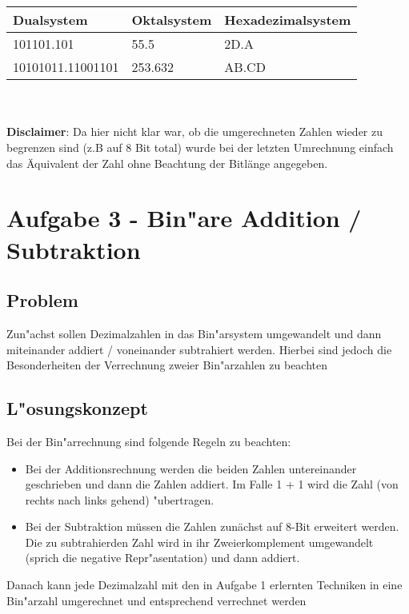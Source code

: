 \documentclass[a4paper,11pt,titlepage]{article}
\begin{document}
    \\ \\

    \begin{table}[h]
        \centering
        \begin{tabular}{|l|l|l|}
            \hline
            Dualsystem        & Oktalsystem & Hexadezimalsystem \\ \hline
            101101.101        & 55.5        & 2D.A              \\ \hline
            10101011.11001101 & 253.632     & AB.CD             \\ \hline
        \end{tabular}
        \label{tab:table}
    \end{table}

    \\ \\

    \noindent \textbf{Disclaimer}: Da hier nicht klar war, ob die umgerechneten Zahlen wieder zu begrenzen sind (z.B auf 8 Bit total) wurde bei der letzten Umrechnung einfach das Äquivalent der Zahl ohne Beachtung der Bitlänge angegeben.


    \section{Aufgabe 3 - Bin"are Addition / Subtraktion}

    \subsection{Problem}
    Zun"achst sollen Dezimalzahlen in das Bin"arsystem umgewandelt und dann miteinander addiert / voneinander subtrahiert werden. Hierbei sind jedoch die Besonderheiten der Verrechnung zweier Bin"arzahlen zu beachten

    \subsection{L"osungskonzept}
    Bei der Bin"arrechnung sind folgende Regeln zu beachten:
    \begin{itemize}
        \item Bei der Additionsrechnung werden die beiden Zahlen untereinander geschrieben und dann die Zahlen addiert. Im Falle 1 + 1 wird die Zahl (von rechts nach links gehend) "ubertragen.
        \item Bei der Subtraktion müssen die Zahlen zunächst auf 8-Bit erweitert werden. Die zu subtrahierden Zahl wird in ihr Zweierkomplement umgewandelt (sprich die negative Repr"asentation) und dann addiert.
    \end{itemize}
    Danach kann jede Dezimalzahl mit den in Aufgabe 1 erlernten Techniken in eine Bin"arzahl umgerechnet und entsprechend verrechnet werden
\end{document}
